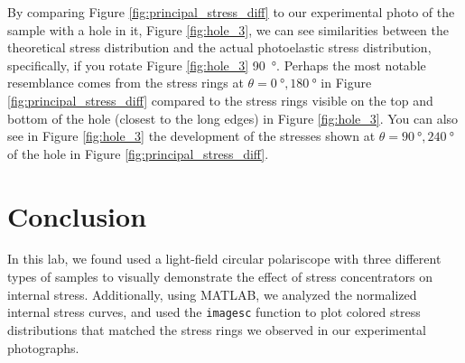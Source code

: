 \documentclass[12 pt]{article}
\begin{document}
By comparing Figure \ref{fig:principal_stress_diff} to our experimental photo of the sample with a hole in it, Figure \ref{fig:hole_3}, we can see similarities between the theoretical stress distribution and the actual photoelastic stress distribution, specifically, if you rotate Figure \ref{fig:hole_3} \qty{90}{\degree}. Perhaps the most notable resemblance comes from the stress rings at $\theta=\qty{0}{\degree},
\qty{180}{\degree}$ in Figure \ref{fig:principal_stress_diff} compared to the stress rings visible on the top and bottom of the hole (closest to the long edges) in Figure \ref{fig:hole_3}. You can also see in Figure \ref{fig:hole_3} the development of the stresses shown at $\theta=\qty{90}{\degree},\qty{240}{\degree}$ of the hole in Figure \ref{fig:principal_stress_diff}.

\section{Conclusion} \label{conclusion}
In this lab, we found used a light-field circular polariscope with three different types of samples to visually demonstrate the effect of stress concentrators on internal stress. Additionally, using MATLAB, we analyzed the normalized internal stress curves, and used the \texttt{imagesc} function to plot colored stress distributions that matched the stress rings we observed in our experimental photographs.
\end{document}
